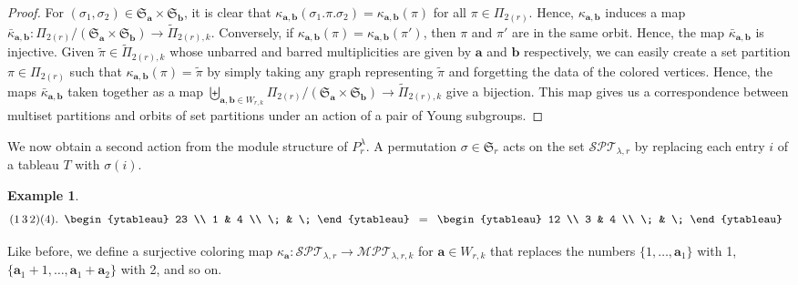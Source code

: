 \documentclass[10pt]{amsart}
\theoremstyle{definition}
\theoremstyle{definition}
\newtheorem{exam}[exam]{Example}
\theoremstyle{plain}
\theoremstyle{remark}
\theoremstyle{plain}
\theoremstyle{plain}
\newcommand{\SG}{\mathfrak{S}}
\newcommand{\bfa}{{\boldsymbol{a}}}
\newcommand{\bfb}{{\boldsymbol{b}}}
\newcommand{\MPT}{\mathcal{MPT}}
\newcommand{\SPT}{\mathcal{SPT}}
\newcommand{\tpi}{{\tilde{\pi}}}
\newcommand{\ov}[1]{\bar{#1}}
\newcommand{\inline}[1]{\begin{array}{c}#1\end{array}}
\begin{document}
\begin{proof}

For $(\sigma_1,\sigma_2)\in \SG_\bfa\times\SG_\bfb$, it is clear that $\kappa_{\bfa,\bfb}(\sigma_1.\pi.\sigma_2)=\kappa_{\bfa,\bfb}(\pi)$ for all $\pi\in\Pi_{2(r)}$. Hence, $\kappa_{\bfa,\bfb}$ induces a map $\ov\kappa_{\bfa,\bfb}:\Pi_{2(r)}/(\SG_\bfa\times\SG_\bfb)\rightarrow\tilde\Pi_{2(r),k}$. Conversely, if $\kappa_{\bfa,\bfb}(\pi)=\kappa_{\bfa,\bfb}(\pi')$, then $\pi$ and $\pi'$ are in the same orbit. Hence, the map $\ov\kappa_{\bfa,\bfb}$ is injective. Given $\tpi\in\tilde\Pi_{2(r),k}$ whose unbarred and barred multiplicities are given by $\bfa$ and $\bfb$ respectively, we can easily create a set partition $\pi\in\Pi_{2(r)}$ such that $\kappa_{\bfa,\bfb}(\pi)=\tpi$ by simply taking any graph representing $\tpi$ and forgetting the data of the colored vertices. Hence, the maps $\ov\kappa_{\bfa,\bfb}$ taken together as a map $\biguplus_{\bfa,\bfb\in W_{r,k}} \Pi_{2(r)}/(\SG_\bfa\times\SG_\bfb)\to\tilde\Pi_{2(r),k}$ give a bijection. This map gives us a correspondence between multiset partitions and orbits of set partitions under an action of a pair of Young subgroups.
\end{proof}

We now obtain a second action from the module structure of $P_r^\lambda$. A permutation $\sigma\in\SG_r$ acts on the set $\SPT_{\lambda,r}$ by replacing each entry $i$ of a tableau $T$ with $\sigma(i)$.

\begin{exam}
    \[(1\,3\,2)(4).\inline{\begin{ytableau}
        23 \\
        1 & 4 \\
        \; & \;
    \end{ytableau}}=\inline{\begin{ytableau}
        12 \\
        3 & 4 \\
        \; & \;
    \end{ytableau}}\]
\end{exam}

Like before, we define a surjective coloring map $\kappa_\bfa:\SPT_{\lambda,r}\to\MPT_{\lambda,r,k}$ for $\bfa\in W_{r,k}$ that replaces the numbers $\{1,\dots,\bfa_1\}$ with 1, $\{\bfa_1+1,\dots,\bfa_1+\bfa_2\}$ with 2, and so on.
\end{document}
